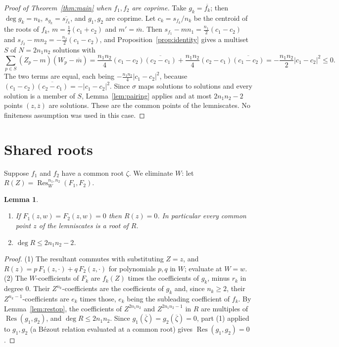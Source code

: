 \documentclass[11pt]{amsart}
\newtheorem{lemma}[theorem]{Lemma}
\theoremstyle{remark}\newtheorem{remark}[theorem]{Remark}
\theoremstyle{definition}\newtheorem{example}[theorem]{Example}
\newcommand{\Res}{\operatorname{Res}}
\newcommand{\cl}{\overline}
\begin{document}
\begin{proof}[Proof of Theorem~\ref{thm:main} when $f_1,f_2$ are coprime]
Take $g_k=\cl{f_k}$; then $\deg g_k=n_k$, $s_{g_k}=\cl{s_{f_k}}$, and $g_1,g_2$ are coprime. Let $c_k=s_{f_k}/n_k$ be
the centroid of the roots of $f_k$, $m=\tfrac12(c_1+c_2)$ and $m'=\cl m$. Then $s_{f_1}-mn_1=\tfrac{n_1}2(c_1-c_2)$
and $s_{f_2}-mn_2=-\tfrac{n_2}2(c_1-c_2)$, and Proposition~\ref{prop:identity} gives a multiset $S$ of
$N=2n_1n_2$ solutions with
\[
\sum_{p\in S}(Z_p-m)(W_p-\cl m)=\frac{n_1n_2}{4}(c_1-c_2)\cl{(c_2-c_1)}+\frac{n_1n_2}{4}(c_2-c_1)\cl{(c_1-c_2)}
=-\frac{n_1n_2}{2}|c_1-c_2|^2\le0 .
\]
The two terms are equal, each being $-\tfrac{n_1n_2}{4}|c_1-c_2|^2$, because $(c_1-c_2)\cl{(c_2-c_1)}=-|c_1-c_2|^2$.
Since $\sigma$ maps solutions to solutions and every solution is a member of $S$, Lemma~\ref{lem:pairing} applies
and at most $2n_1n_2-2$ points $(z,\cl z)$ are solutions. These are the common points of the lemniscates. No
finiteness assumption was used in this case.
\end{proof}

\section{Shared roots}\label{sec:shared}

Suppose $f_1$ and $f_2$ have a common root $\zeta$. We eliminate $W$: let $R(Z)=\Res^{n_1,n_2}_W(F_1,F_2)$.

\begin{lemma}\label{lem:R}
\begin{enumerate}
\item If $F_1(z,w)=F_2(z,w)=0$ then $R(z)=0$. In particular every common point $z$ of the lemniscates is a root of
$R$.
\item $\deg R\le 2n_1n_2-2$.
\end{enumerate}
\end{lemma}

\begin{proof}
(1) The resultant commutes with substituting $Z=z$, and $R(z)=p\,F_1(z,\cdot)+q\,F_2(z,\cdot)$ for polynomials $p,q$
in $W$; evaluate at $W=w$. (2) The $W$-coefficients of $F_k$ are $f_k(Z)$ times the coefficients of $g_k$, minus
$r_k$ in degree $0$. Their $Z^{n_k}$-coefficients are the coefficients of $g_k$ and, since $n_k\ge2$, their
$Z^{n_k-1}$-coefficients are $e_k$ times those, $e_k$ being the subleading coefficient of $f_k$. By
Lemma~\ref{lem:restop}, the coefficients of $Z^{2n_1n_2}$ and $Z^{2n_1n_2-1}$ in $R$ are multiples of
$\Res(g_1,g_2)$, and $\deg R\le2n_1n_2$. Since $g_1(\cl\zeta)=g_2(\cl\zeta)=0$, part (1) applied to $g_1,g_2$ (a
B\'ezout relation evaluated at a common root) gives $\Res(g_1,g_2)=0$.
\end{proof}
\end{document}
